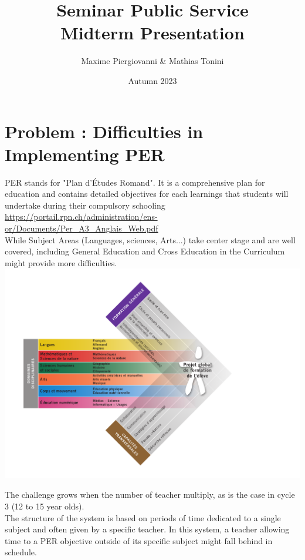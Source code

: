\documentclass[a4paper,11pt]{article}
\title{Seminar Public Service \\ Midterm Presentation}
\author{Maxime Piergiovanni \& Mathias Tonini}
\date{Autumn 2023}
\begin{document}
\maketitle

\section*{Problem : Difficulties in Implementing PER}

PER stands for "Plan d'Études Romand". It is a comprehensive plan for education and contains detailed  objectives for each learnings that students will undertake during their compulsory schooling \\

\url{https://portail.rpn.ch/administration/ens-or/Documents/Per_A3_Anglais_Web.pdf} \\

While Subject Areas (Languages, sciences, Arts...) take center stage and are well covered, including General Education and Cross Education in the Curriculum might provide more difficulties. \\

\includegraphics[scale=0.5]{./fleche_per.pdf}

The challenge grows when the number of teacher multiply, as is the case in cycle 3  (12 to 15 year olds). \\
The structure of the system is based on periods of time dedicated to a single subject and often given by a specific teacher. In this system, a teacher allowing time to a PER objective outside of its specific subject might fall behind in schedule. \\
\end{document}
